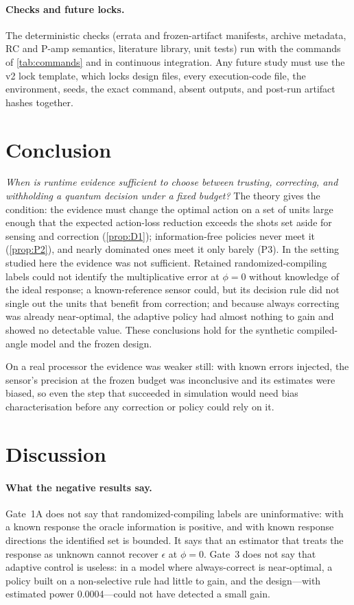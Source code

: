 \documentclass[10pt,twocolumn]{article}
\theoremstyle{definition}
\theoremstyle{remark}
\newcommand{\eps}{\epsilon}
\begin{document}
\paragraph{Checks and future locks.} The deterministic checks (errata and frozen-artifact manifests, archive metadata, RC and P-amp semantics, literature library, unit tests) run with the commands of \cref{tab:commands} and in continuous integration. Any future study must use the v2 lock template, which locks design files, every execution-code file, the environment, seeds, the exact command, absent outputs, and post-run artifact hashes together.

\section{Conclusion}\label{sec:conclusion}
\emph{When is runtime evidence sufficient to choose between trusting, correcting, and withholding a quantum decision under a fixed budget?} The theory gives the condition: the evidence must change the optimal action on a set of units large enough that the expected action-loss reduction exceeds the shots set aside for sensing and correction (\cref{prop:D1}); information-free policies never meet it (\cref{prop:P2}), and nearly dominated ones meet it only barely (P3). In the setting studied here the evidence was not sufficient. Retained randomized-compiling labels could not identify the multiplicative error at $\phi=0$ without knowledge of the ideal response; a known-reference sensor could, but its decision rule did not single out the units that benefit from correction; and because always correcting was already near-optimal, the adaptive policy had almost nothing to gain and showed no detectable value. These conclusions hold for the synthetic compiled-angle model and the frozen design.

On a real processor the evidence was weaker still: with known errors injected, the sensor's precision at the frozen budget was inconclusive and its estimates were biased, so even the step that succeeded in simulation would need bias characterisation before any correction or policy could rely on it.

\section{Discussion}\label{sec:discussion}

\paragraph{What the negative results say.} Gate~1A does not say that randomized-compiling labels are uninformative: with a known response the oracle information is positive, and with known response directions the identified set is bounded. It says that an estimator that treats the response as unknown cannot recover $\eps$ at $\phi=0$. Gate~3 does not say that adaptive control is useless: in a model where always-correct is near-optimal, a policy built on a non-selective rule had little to gain, and the design---with estimated power 0.0004---could not have detected a small gain.
\end{document}

